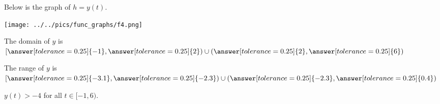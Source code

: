 \documentclass{ximera}
\author{Lee Wayand}
\begin{document}
\begin{exercise}  





Below is the graph of $h=y(t)$.  

\begin{image}
\texttt{[image: ../../pics/func\_graphs/f4.png]}
\end{image}









\begin{question} 


The domain of $y$ is  $\left[ \answer[tolerance=0.25]{-1}, \answer[tolerance=0.25]{2} \right) \cup  \left( \answer[tolerance=0.25]{2}, \answer[tolerance=0.25]{6} \right) $   \\



\begin{multipleChoice}
\end{multipleChoice}

\end{question}






\begin{question} 


The range of $y$ is  $\left[ \answer[tolerance=0.25]{-3.1}, \answer[tolerance=0.25]{-2.3} \right) \cup  \left( \answer[tolerance=0.25]{-2.3}, \answer[tolerance=0.25]{0.4} \right) $   \\



\begin{multipleChoice}
\end{multipleChoice}


\end{question}









\begin{question} 



$y(t) > -4$ for all $t \in [-1, 6)$.
\begin{multipleChoice}
\end{multipleChoice}


\end{question}
\end{exercise}
\end{document}
